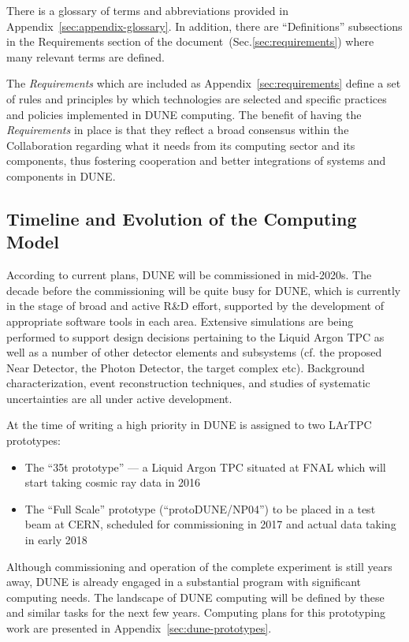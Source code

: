 There is a glossary of terms and abbreviations provided in Appendix~\ref{sec:appendix-glossary}. In addition,
there are ``Definitions'' subsections in the Requirements section of the document~(Sec.\ref{sec:requirements}) where
many relevant terms are defined.

The \textit{Requirements} which are included as Appendix~\ref{sec:requirements}
define a set of rules and principles by which technologies are selected and specific practices and policies implemented in DUNE computing.
The benefit of having the \textit{Requirements} in place is that they reflect a broad consensus within the Collaboration regarding what it needs from
its computing sector and its components, thus fostering cooperation and better integrations of systems and components in DUNE.

\subsection{Timeline and Evolution of the Computing Model}
According to current plans, DUNE will be commissioned in mid-2020s. The decade before the commissioning will be quite busy
for DUNE, which is currently in the stage of broad and active R\&D effort, supported by the development of appropriate 
software tools in each area. Extensive simulations are being performed to support design decisions pertaining to the Liquid 
Argon TPC as well as a number of other detector elements and subsystems (cf. the proposed Near Detector, the Photon Detector, 
the target complex etc). Background characterization, event reconstruction techniques, and studies of systematic 
uncertainties are all under active development.

At the time of writing a high priority in DUNE is assigned to two LArTPC prototypes:
\begin{itemize}
\item The ``35t prototype'' --- a Liquid Argon TPC situated at FNAL which will start taking cosmic ray data in 2016
\item The ``Full Scale'' prototype (``protoDUNE/NP04'') to be placed in a test beam at CERN, 
scheduled for commissioning in 2017 and actual data taking in early 2018
\end{itemize}
\noindent
Although commissioning and operation of the complete experiment is still years away, DUNE is
already engaged in a substantial program with significant computing needs. The
landscape of DUNE computing will be defined by these and similar tasks for the next few years. Computing plans for this prototyping
work are presented in Appendix~\ref{sec:dune-prototypes}.

